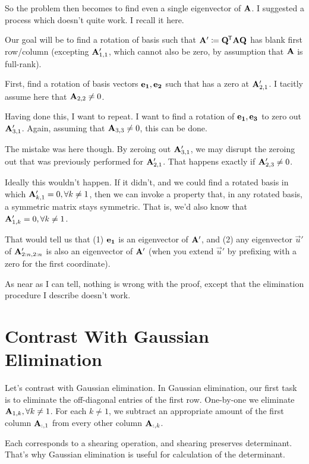 \documentclass[11pt, oneside]{amsart}
\begin{document}
So the problem then becomes to find even a single eigenvector of
$\mathbf{A}$. I suggested a process which doesn't quite work. I recall it
here.

Our goal will be to find a rotation of basis such that $\mathbf{A}' \coloneqq
\mathbf{Q}^{\mkern-1.5mu\mathsf{T}} \mathbf{A} \mathbf{Q}$ has blank first row/column (excepting
$\mathbf{A}'_{1, 1}$, which cannot also be zero, by assumption that $\mathbf{A}$
is full-rank).

First, find a rotation of basis vectors $\mathbf{e}_{\mathbf{1}}, \mathbf{e}_{\mathbf{2}}$ such that
has a zero at $\mathbf{A}'_{2, 1}$. I tacitly assume here that $\mathbf{A}_{2, 2}
\ne 0$.

Having done this, I want to repeat. I want to find a rotation of
$\mathbf{e}_{\mathbf{1}}, \mathbf{e}_{\mathbf{3}}$ to zero out $\mathbf{A}'_{3, 1}$. Again, assuming that
$\mathbf{A}_{3, 3} \ne 0$, this can be done.

The mistake was here though. By zeroing out $\mathbf{A}'_{3, 1}$, we may
disrupt the zeroing out that was previously performed for $\mathbf{A}'_{2,
1}$. That happens exactly if $\mathbf{A}'_{2, 3} \ne 0$.

Ideally this wouldn't happen. If it didn't, and we could find a rotated
basis in which $\mathbf{A}'_{k, 1} = 0, \forall k\ne 1$, then we can invoke a
property that, in any rotated basis, a symmetric matrix stays symmetric.
That is, we'd also know that $\mathbf{A}'_{1, k} = 0, \forall k\ne 1$.

That would tell us that (1) $\mathbf{e}_{\mathbf{1}}$ is an eigenvector of $\mathbf{A}'$,
and (2) any eigenvector $\vec{u}'$ of $\mathbf{A}'_{2:n, 2:n}$ is also an
eigenvector of $\mathbf{A}'$ (when you extend $\vec{u}'$ by prefixing with a
zero for the first coordinate).

As near as I can tell, nothing is wrong with the proof, except that the
elimination procedure I describe doesn't work.

\section{Contrast With Gaussian Elimination}

Let's contrast with Gaussian elimination. In Gaussian elimination, our
first task is to eliminate the off-diagonal entries of the first row.
One-by-one we eliminate $\mathbf{A}_{1, k}, \forall k \ne 1$. For each $k \ne
1$, we subtract an appropriate amount of the first column $\mathbf{A}_{:, 1}$
from every other column $\mathbf{A}_{:, k}$.

Each  corresponds to a shearing
operation, and shearing preserves determinant. That's why Gaussian
elimination is useful for calculation of the determinant.
\end{document}
